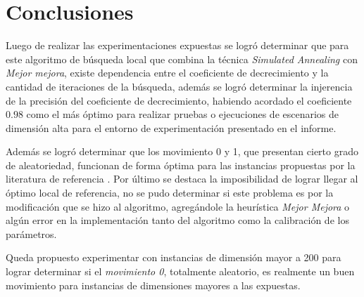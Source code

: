 \section{Conclusiones}




Luego de realizar las experimentaciones expuestas se logró determinar que para este algoritmo de búsqueda local que combina la técnica \textit{Simulated Annealing} con \textit{Mejor mejora}, existe dependencia entre el coeficiente de decrecimiento y la cantidad de iteraciones de la búsqueda, además se logró determinar la injerencia de la precisión del coeficiente de decrecimiento, habiendo acordado el coeficiente $0.98$ como el más óptimo para realizar pruebas o ejecuciones de escenarios de dimensión alta para el entorno de experimentación presentado en el informe.

Además se logró determinar que los movimiento 0 y 1, que presentan cierto grado de aleatoriedad, funcionan de forma óptima para las instancias propuestas por la literatura de referencia \cite{sonuc-2017}.
Por último se destaca la imposibilidad de lograr llegar al óptimo local de referencia, no se pudo determinar si este problema es por la modificación que se hizo al algoritmo, agregándole la heurística \textit{Mejor Mejora} o algún error en la implementación tanto del algoritmo como la calibración de los parámetros.

Queda propuesto experimentar con instancias de dimensión mayor a 200 para lograr determinar si el \textit{movimiento 0}, totalmente aleatorio, es realmente un buen movimiento para instancias de dimensiones mayores a las expuestas.
